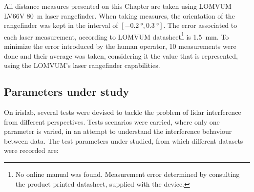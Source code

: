 All distance measures presented on this Chapter are taken using LOMVUM LV66V \SI{80}{\meter} laser rangefinder. When taking measures, the orientation of the rangefinder was kept in the interval of $[\SI{-0.2}{\degree}, \SI{0.3}{\degree}]$. The error associated to each laser measurement, according to LOMVUM datasheet\footnote{No online manual was found. Measurement error determined by consulting the product printed datasheet, supplied with the device.} is \SI{1.5}{\milli\meter}. To minimize the error introduced by the human operator, 10 measurements were done and their average was taken, considering it the value that is represented, using the LOMVUM's laser rangefinder capabilities.


\subsection{Parameters under study}
\label{subsec:lidar-interference:parameters-under-test}
On \ac{irislab}, several tests were devised to tackle the problem of \ac{lidar} interference from different perspectives. Tests scenarios were carried, where only one parameter is varied, in an attempt to understand the interference behaviour between data. The test parameters under studied, from which different datasets were recorded are:


